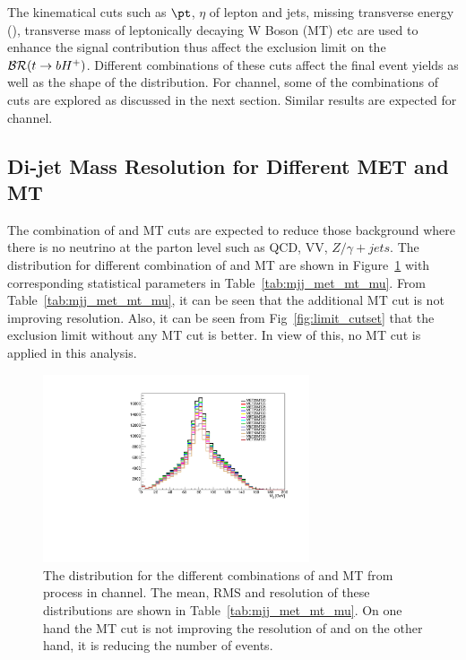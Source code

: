
The kinematical cuts such as $\pt$, $\eta$ of lepton and jets, missing transverse energy (\MET),
transverse mass of leptonically decaying W Boson (MT) etc are used to enhance the signal contribution thus 
affect the exclusion limit on the ${\cal{BR}}(t \rightarrow b H^+)$.
Different combinations of these cuts affect the final event yields as well as the shape of the
\mjj distribution. For \mujets channel, some of the combinations of cuts are 
explored as discussed in the next section. Similar results are expected for \ejets channel.

\subsection{Di-jet Mass Resolution for Different MET and MT}
The combination of \MET and MT cuts are expected to reduce those background where there is 
no neutrino at the parton level such as QCD, VV, $Z/\gamma+ jets$. The \mjj distribution for different combination of \MET and MT are shown in Figure~\ref{fig:mjj_met_mt_mu} with corresponding statistical parameters in 
Table~\ref{tab:mjj_met_mt_mu}. From Table~\ref{tab:mjj_met_mt_mu}, it can be seen that the additional MT cut 
is not improving \mjj resolution. Also, it can be seen from Fig~\ref{fig:limit_cutset} 
that the exclusion limit without any MT cut is better. In view of this, no MT cut is applied in this analysis.

\begin{figure}
\begin{center}
\includegraphics[width=0.70\textwidth]{Image/Limit/mjj_met_mt_mu.pdf}
\caption{The \mjj distribution for the different combinations of \MET and MT from \ttjets process
    in \mujets channel. The mean, RMS and resolution of these distributions are shown in 
    Table~\ref{tab:mjj_met_mt_mu}. On one hand the MT cut is not improving the resolution of \mjj and on 
    the other hand, it is reducing the number of events.}
\label{fig:mjj_met_mt_mu}
\end{center}
\end{figure}

